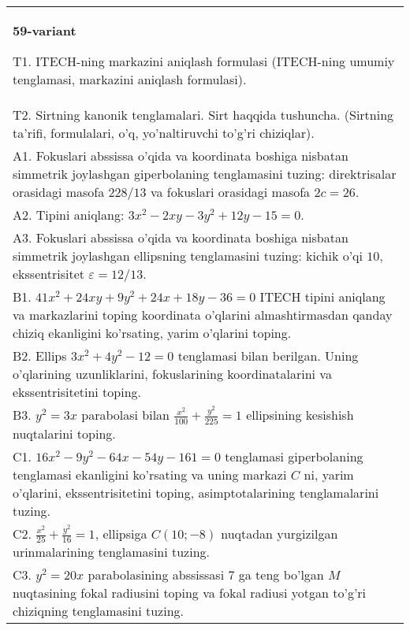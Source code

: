 \documentclass{article}
\begin{document}
\begin{tabular}{m{17cm}}
\textbf{59-variant}
\newline

T1. ITECH-ning markazini aniqlash formulasi (ITECH-ning umumiy tenglamasi, markazini aniqlash formulasi).\\

T2. Sirtning kanonik tenglamalari. Sirt haqqida tushuncha. (Sirtning ta'rifi, formulalari, o'q, yo'naltiruvchi to'g'ri chiziqlar).\\

A1. Fokuslari abssissa o'qida va koordinata boshiga nisbatan simmetrik joylashgan giperbolaning tenglamasini tuzing: direktrisalar orasidagi masofa $228/13$ va fokuslari orasidagi masofa $2c=26$.\\

A2. Tipini aniqlang: $3x^{2}-2xy-3y^{2}+12y-15=0$.\\

A3. Fokuslari abssissa o'qida va koordinata boshiga nisbatan simmetrik joylashgan ellipsning tenglamasini tuzing: kichik o'qi $10$, ekssentrisitet $\varepsilon=12/13$.\\

B1. $41x^{2} + 24xy + 9y^{2} + 24x + 18y - 36 = 0$ ITECH tipini aniqlang va markazlarini toping koordinata o'qlarini almashtirmasdan qanday chiziq ekanligini ko'rsating, yarim o'qlarini toping.  \\

B2. Ellips $3x^{2} + 4y^{2} - 12 = 0$ tenglamasi bilan berilgan. Uning o'qlarining uzunliklarini, fokuslarining koordinatalarini va ekssentrisitetini toping.  \\

B3. $y^{2} = 3x$ parabolasi bilan $\frac{x^{2}}{100} + \frac{y^{2}}{225} = 1$ ellipsining kesishish nuqtalarini toping.  \\

C1. $16x^{2} - 9y^{2} - 64x - 54y - 161 = 0$ tenglamasi giperbolaning tenglamasi ekanligini ko'rsating va uning markazi $C$ ni, yarim o'qlarini, ekssentrisitetini toping, asimptotalarining tenglamalarini tuzing.  \\

C2. $\frac{x^{2}}{25} + \frac{y^{2}}{16} = 1$, ellipsiga $C(10; - 8)$ nuqtadan yurgizilgan urinmalarining tenglamasini tuzing.  \\

C3. $y^{2} = 20x$ parabolasining abssissasi 7 ga teng bo'lgan $M$ nuqtasining fokal radiusini toping va fokal radiusi yotgan to'g'ri chiziqning tenglamasini tuzing.  \\

\end{tabular}
\vspace{1cm}
\end{document}
